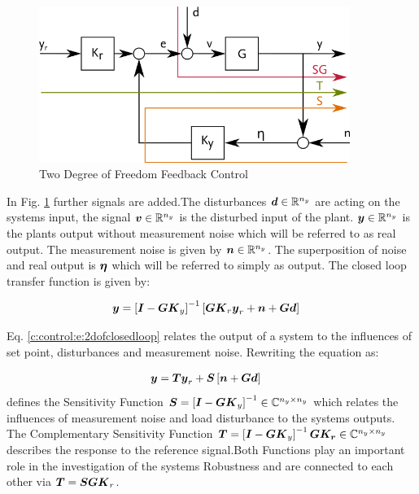 \begin{figure}[H]
\begin{minipage}[b]{\textwidth}
\centering
\includegraphics[width=0.9\textwidth]{./Graphics/2DOFCLOSEDLOOP.png}
\caption{Two Degree of Freedom Feedback Control}
\label{c:control:f:2dofclosedloop}
\end{minipage}
\end{figure}

In Fig. \ref{c:control:f:2dofclosedloop} further signals are added.The disturbances $\mbox{\boldmath$d$} \in \mathbb{R}^{n_y}$ are acting on the systems input, the signal $\mbox{\boldmath$v$} \in \mathbb{R}^{n_y}$ is the disturbed input of the plant. $\mbox{\boldmath$y$} \in \mathbb{R}^{n_y}$ is the plants output without measurement noise which will be referred to as real output. The measurement noise is given by $\mbox{\boldmath$n$} \in \mathbb{R}^{n_y}$. The superposition of noise and real output is $\mbox{\boldmath$\eta$}$ which will be referred to simply as output. The closed loop transfer function is given by:

\begin{align}
\begin{split}
\mbox{\boldmath$y$} &= \left[\mbox{\boldmath$I$} - \mbox{\boldmath$G$} \mbox{\boldmath$K$}_y\right]^{-1} \left[ \mbox{\boldmath$G$}\mbox{\boldmath$K$}_r \mbox{\boldmath$y$}_r + \mbox{\boldmath$n$} + \mbox{\boldmath$G$} \mbox{\boldmath$d$} \right]
\end{split}
\label{c:control:e:2dofclosedloop}
\end{align}

Eq. \ref{c:control:e:2dofclosedloop} relates the output of a system to the influences of set point, disturbances and measurement noise. 
Rewriting the equation as:

\begin{align}
\begin{split}
\mbox{\boldmath$y$} &= \mbox{\boldmath$T$}\mbox{\boldmath$y$}_r + \mbox{\boldmath$S$} \left[ \mbox{\boldmath$n$} + \mbox{\boldmath$G$} \mbox{\boldmath$d$} \right]
\end{split}
\label{c:control:e:sensitivityclosedloop}
\end{align}
defines the Sensitivity Function $\mbox{\boldmath$S$} = \left[ \mbox{\boldmath$I$} - \mbox{\boldmath$G$} \mbox{\boldmath$K$}_y\right]^{-1} \in \mathbb{C}^{n_y \times n_y}$ which relates the influences of measurement noise and load disturbance to the systems outputs. The Complementary Sensitivity Function $\mbox{\boldmath$T$} = \left[\mbox{\boldmath$I$} - \mbox{\boldmath$G$} \mbox{\boldmath$K$}_y\right]^{-1} \mbox{\boldmath$G$} \mbox{\boldmath$K_r$} \in \mathbb{C}^{n_y \times n_y}$ describes the response to the reference signal.Both Functions play an important role in the investigation of the systems Robustness and are connected to each other via $\mbox{\boldmath$T$} = \mbox{\boldmath$S$} \mbox{\boldmath$G$} \mbox{\boldmath$K$}_r$.\\

